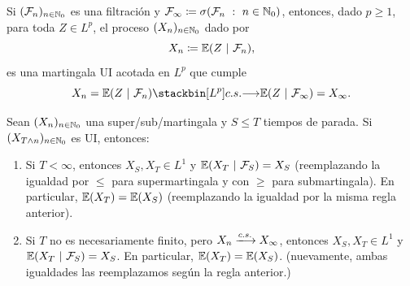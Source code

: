 \begin{theorem}
	Si $(\mathcal{F}_{n})_{n \in \mathbb{N}_{0}}$ es una filtración y $\mathcal{F}_{\infty} \coloneq \sigma(\mathcal{F}_{n} \ : \ n \in \mathbb{N}_{0})$, entonces, dado $p \geq 1$, para toda $Z \in L^{p}$, el proceso $(X_{n})_{n \in \mathbb{N}_{0}}$ dado por
	\[ X_{n} \coloneq \mbb{E}(Z \ | \ \mcal{F}_{n}), \]
	es una martingala UI acotada en $L^{p}$ que cumple
	\[ X_{n} = \mbb{E}(Z \ | \ \mcal{F}_{n}) \stackbin[L^{p}]{c.s.}{\longrightarrow} \mbb{E}(Z \ | \ \mcal{F}_{\infty}) = X_{\infty}. \]
\end{theorem}

\begin{theorem}
	Sean $(X_{n})_{n \in \mathbb{N}_{0}}$ una super/sub/martingala y $S \leq T$ tiempos de parada. Si $(X_{T \wedge n})_{n \in \mathbb{N}_{0}}$ es UI, entonces:
	\begin{enumerate}
		\item Si $T < \infty$, entonces $X_{S}, X_{T} \in L^{1}$ y $\mathbb{E}(X_{T} \ | \ \mathcal{F}_{S}) = X_{S}$ (reemplazando la igualdad por $\leq$ para supermartingala y con $\geq$ para submartingala). En particular, $\mathbb{E}(X_{T}) = \mathbb{E}(X_{S})$ (reemplazando la igualdad por la misma regla anterior).

		\item Si $T$ no es necesariamente finito, pero $X_{n} \xlongrightarrow{c.s.} X_{\infty}$, entonces $X_{S}, X_{T} \in L^{1}$ y $\mathbb{E}(X_{T} \ | \ \mathcal{F}_{S}) = X_{S}$. En particular, $\mathbb{E}(X_{T}) = \mathbb{E}(X_{S})$. (nuevamente, ambas igualdades las reemplazamos según la regla anterior.)
	\end{enumerate}
\end{theorem}
